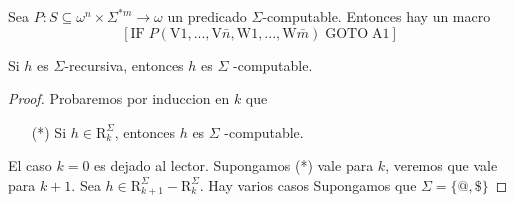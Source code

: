   \begin{proposition}
    Sea $P:S\subseteq \omega ^{n}\times \Sigma ^{\ast m}\rightarrow \omega $ un predicado $\Sigma $-computable.
    Entonces hay un macro
    \[
    \displaystyle \left[ \mathrm{IF}\;P(\mathrm{V}1,...,\mathrm{V}\bar{n},\mathrm{W}1,...,
    \mathrm{W}\bar{m})\;\mathrm{GOTO}\;\mathrm{A}1\right]
    \]
  \end{proposition}

  \begin{theorem}
    Si $h$ es $\Sigma $-recursiva, entonces $h$ es $\Sigma $ -computable.

  \begin{proof}
    Probaremos por induccion en $k$ que
    \begin{itemize}
      \item[(*)] Si $h\in \mathrm{R}_{k}^{\Sigma }$, entonces $h$ es $\Sigma $ -computable.
    \end{itemize}
    El caso $k=0$ es dejado al lector.
    Supongamos (*) vale para $k$, veremos que vale para $k+1$.
    Sea $h\in \mathrm{R}_{k+1}^{\Sigma }-\mathrm{R} _{k}^{\Sigma }.$ Hay varios casos
    Supongamos que $\Sigma = \{@, \$\}$


\end{proof}
\end{theorem}
